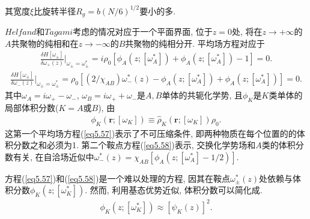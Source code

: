 其宽度$\xi$比旋转半径$R_{g}=b(N/6)^{1/2}$要小的多.
\par
$Helfand$和$Tagami$考虑的情况对应于一个平面界面, 位于$z=0$处,
将在$z\longrightarrow +\infty$的$A$共聚物的纯相和在$z\longrightarrow
-\infty$的$B$共聚物的纯相分开. 平均场方程对应于
\label{subsec.equations}
    \begin{equation}
        \begin{aligned}
            \frac{\delta H[\omega_{\pm}]}{\delta
            \omega_{+}(z)}|_{\omega_{\pm}=\omega^{*}_{\pm}}=i\rho_{0}[\phi_{A}(z;
            [\omega^{*}_{A}])+\phi_{A}(z;
            [\omega^{*}_{A}])-1]=0.
                   \end{aligned}
        \label{eq5.57}
    \end{equation}
\label{subsec.equations}
    \begin{equation}
        \begin{aligned}
            \frac{\delta H[\omega_{\pm}]}{\delta
            \omega_{-}(z)}|_{\omega_{\pm}=\omega^{*}_{\pm}}=\rho_{0}[(2/\chi_{AB})\omega^{*}_{-}(z)-\phi_{A}(z;
            [\omega^{*}_{A}])+\phi_{A}(z;
            [\omega^{*}_{A}])]=0.
                   \end{aligned}
        \label{eq5.58}
    \end{equation}
其中$\omega_{A}=i\omega_{+}-\omega_{-}$,
$\omega_{B}=i\omega_{+}+\omega_{-}$是$A,B$单体的共轭化学势,
且$\phi_{K}$是$K$类单体的局部体积分数($K=A$或$B$), 由
\label{subsec.equations}
    \begin{equation}
        \begin{aligned}
        \phi_{K}(\bm{r}; [\omega_{K}])\equiv \hat{\rho}_{K}(\bm{r};
            [\omega_{K}])\rho_{0}.
        \end{aligned}
        \label{eq5.59}
    \end{equation}
这第一个平均场方程(\ref{eq5.57})表示了不可压缩条件,
即两种物质在每个位置的的体积分数之和必须为1. 第二个鞍点方程(\ref{eq5.58})表示,
交换化学势场和$A$类的体积分数有关,
在自洽场近似中$\omega^{*}_{-}(z)=\chi_{AB}[\phi_{A}(z; [\omega^{*}_{A}]-1/2)]$.
\par
方程(\ref{eq5.57})和(\ref{eq5.58})是一个难以处理的方程,
因其在鞍点$\omega^{*}_{\pm}(z)$处依赖与体积分数$\phi_{K}(z; [\omega^{*}_{K}])$.
然而, 利用基态优势近似, 体积分数可以简化成.
\label{subsec.equations}
    \begin{equation}
        \begin{aligned}
            \phi_{K}(z; [\omega^{*}_{K}])\approx[\psi_{K}(z)]^2.
        \end{aligned}
        \label{eq5.60}
    \end{equation}
